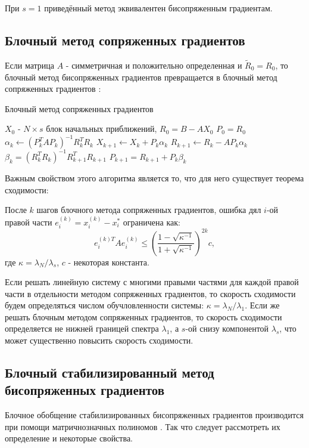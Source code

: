 При $s=1$ приведённый метод эквивалентен бисопряженным градиентам. 

\subsection[Блочный метод сопряженных градиентов]{Блочный метод сопряженных градиентов}
Если матрица $A$ - симметричная и положительно определенная и $\tilde{R}_0 = R_0$, 
то блочный метод бисопряженных градиентов превращается в блочный метод сопряженных градиентов \cite{OLEARY1980293}:
\begin{algorithm}[H]   
    \caption{Блочный метод сопряженных градиентов}
    \begin{algorithmic}
        \State $X_0$ - $N \times s$ блок начальных приближений, $R_0 = B - AX_0$
        \State $P_0 = R_0$
            \State $\alpha_k \gets (P_k^T A P_k)^{-1} R_k^T R_k$
            \State $X_{k+1} \gets X_k + P_k \alpha_k$
            \State $R_{k+1} \gets R_k - A P_k \alpha_k$
            \State $\beta_k = (R_k^T R_k)^{-1} R_{k+1}^T R_{k+1}$
            \State $P_{k+1} = R_{k+1} + P_k \beta_k$
        \EndFor 
    \end{algorithmic}
\end{algorithm}
Важным свойством этого алгоритма является то, что для него существует теорема сходимости:
\begin{theorem}
    После  $k$ шагов блочного метода сопряженных градиентов, ошибка дял $i$-ой правой части $e^{(k)}_i = x_i^{(k)} - x_i^*$ ограничена как:
    \begin{equation}
        e^{(k)T}_i A e^{(k)}_i \leq \left( \frac{1 - \sqrt{\kappa^{-1}}}{1 + \sqrt{\kappa^{-1}}} \right)^{2k} c, 
    \end{equation}
    где $\kappa = \lambda_N/\lambda_s$, $c$ - некоторая константа.
\end{theorem}
Если решать линейную систему с многими правыми частями для каждой правой части в отдельности
методом сопряженных градиентов, то скорость сходимости будем определяться числом
обучловленности системы: $\kappa = \lambda_N / \lambda_1$. Если же решать блочным методом
сопряженных градиентов, то скорость сходимости определяется не нижней границей спектра $\lambda_1$,
а $s$-ой снизу компонентой $\lambda_s$, что может существенно повысить скорость сходимости. 

\subsection[Блочный стабилизированный метод бисопряженных градиентов]{Блочный стабилизированный метод бисопряженных градиентов }
Блочное обобщение стабилизированных бисопряженных градиентов производится при помощи
 матричнозначных полиномов \cite{elGuennouni2003}. Так что следует рассмотреть их определение и некоторые свойства. 
